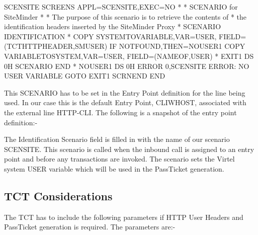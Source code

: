 \documentclass[letterpaper,10pt,english]{sphinxmanual}
\begin{document}
\begin{sphinxVerbatim}[commandchars=\\\{\}]
SCENSITE SCREENS APPL=SCENSITE,EXEC=NO
*
* SCENARIO for SiteMinder
*
* The purpose of this scenario is to retrieve the contents of
* the identification headers inserted by the SiteMinder Proxy
*
SCENARIO IDENTIFICATION
*
        COPY\PYGZdl{} SYSTEM\PYGZhy{}TO\PYGZhy{}VARIABLE,VAR=\PYGZsq{}USER\PYGZsq{}, \PYGZhy{}
                FIELD=(TCT\PYGZhy{}HTTP\PYGZhy{}HEADER,SM\PYGZbs{}\PYGZus{}USER)
        IF\PYGZdl{} NOT\PYGZhy{}FOUND,THEN=NOUSER1
        COPY\PYGZdl{} VARIABLE\PYGZhy{}TO\PYGZhy{}SYSTEM,VAR=\PYGZsq{}USER\PYGZsq{}, \PYGZhy{}
                FIELD=(NAME\PYGZhy{}OF,USER)
*
EXIT1 DS 0H
        SCENARIO END
*
NOUSER1 DS 0H
        ERROR\PYGZdl{} 0,\PYGZsq{}SCENSITE ERROR: NO USER VARIABLE\PYGZsq{}
        GOTO\PYGZdl{} EXIT1
        SCRNEND
        END
\end{sphinxVerbatim}

This SCENARIO has to be set in the Entry Point definition for the line being used. In our case this is the default Entry Point, CLIWHOST, associated with the external line HTTP-CLI. The following is a snapshot of the entry point definition:-

 

The Identification Scenario field is filled in with the name of our scenario SCENSITE. This scenario is called when the inbound call is assigned to an entry point and before any transactions are invoked. The scenario sets the Virtel system USER variable which will be used in the PassTicket generation.


\subsection{TCT Considerations}
\label{\detokenize{connectivity_guide:tct-considerations}}
The TCT has to include the following parameters if HTTP User Headers and PassTicket generation is required. The parameters are:-

\begin{sphinxVerbatim}[commandchars=\\\{\}]
                              
              
  
                                    
\end{sphinxVerbatim}
\end{document}
